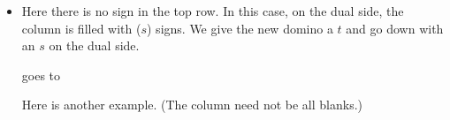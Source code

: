 \documentclass[12pt]{article}
\numberwithin{equation}{section}
\newcommand{\horizontalDominoRSShift}[4]{\filldraw [dominoRSStyle] (#2 - 1 + #4 + \eps, #1 - 1 + \eps) rectangle + (2 - \teps, 1 -\teps) node [dominoText] {$#3$};}
\newcommand{\verticalDominoRSShift}[4]{\filldraw [dominoRSStyle] (#2 - 1 + #4 + \eps,  #1 - 1 + \eps) rectangle + (1 - \teps,2 -\teps) node [dominoText] {$#3$};}
\begin{document}
\begin{itemize}
\begin{itemize}
      \item Here there is no sign in the top row.
      In this case, on the dual side, the column is filled with ($s$) signs.
      We give the new domino a $t$ and go down with an $s$ on the dual side.
      \begin{figure}[H]
        \centering
      \end{figure}
      goes to
      \begin{figure}[H]
        \centering
      \end{figure}
      Here is another example.  (The column need not be all blanks.)
      \begin{figure}[H]

\end{figure}
\end{itemize}
\end{itemize}
\end{document}
